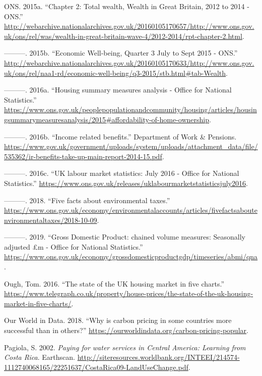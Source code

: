 \documentclass[]{tufte-handout}
\begin{document}
\leavevmode\hypertarget{ref-ONS2015}{}%
ONS. 2015a. ``Chapter 2: Total wealth, Wealth in Great Britain, 2012 to
2014 - ONS.''
\url{http://webarchive.nationalarchives.gov.uk/20160105170657/http://www.ons.gov.uk/ons/rel/was/wealth-in-great-britain-wave-4/2012-2014/rpt-chapter-2.html}.

\leavevmode\hypertarget{ref-ONSWELLBEING2015}{}%
---------. 2015b. ``Economic Well-being, Quarter 3 July to Sept 2015 -
ONS.''
\url{http://webarchive.nationalarchives.gov.uk/20160105170633/http://www.ons.gov.uk/ons/rel/naa1-rd/economic-well-being/q3-2015/stb.html\#tab-Wealth}.

\leavevmode\hypertarget{ref-ONS2016a}{}%
---------. 2016a. ``Housing summary measures analysis - Office for
National Statistics.''
\url{https://www.ons.gov.uk/peoplepopulationandcommunity/housing/articles/housingsummarymeasuresanalysis/2015\#affordability-of-home-ownership}.

\leavevmode\hypertarget{ref-ONS2016c}{}%
---------. 2016b. ``Income related benefits.'' Department of Work \&
Pensions.
\url{https://www.gov.uk/government/uploads/system/uploads/attachment_data/file/535362/ir-benefits-take-up-main-report-2014-15.pdf}.

\leavevmode\hypertarget{ref-ONS2016b}{}%
---------. 2016c. ``UK labour market statistics: July 2016 - Office for
National Statistics.''
\url{https://www.ons.gov.uk/releases/uklabourmarketstatisticsjuly2016}.

\leavevmode\hypertarget{ref-ONS2018}{}%
---------. 2018. ``Five facts about environmental taxes.''
\url{https://www.ons.gov.uk/economy/environmentalaccounts/articles/fivefactsaboutenvironmentaltaxes/2018-10-09}.

\leavevmode\hypertarget{ref-ONS2019}{}%
---------. 2019. ``Gross Domestic Product: chained volume measures:
Seasonally adjusted £m - Office for National Statistics.''
\url{https://www.ons.gov.uk/economy/grossdomesticproductgdp/timeseries/abmi/qna}.

\leavevmode\hypertarget{ref-Ough2016}{}%
Ough, Tom. 2016. ``The state of the UK housing market in five charts.''
\url{https://www.telegraph.co.uk/property/house-prices/the-state-of-the-uk-housing-market-in-five-charts/}.

\leavevmode\hypertarget{ref-OurWorldinData2018}{}%
Our World in Data. 2018. ``Why is carbon pricing in some countries more
successful than in others?''
\url{https://ourworldindata.org/carbon-pricing-popular}.

\leavevmode\hypertarget{ref-Pagiola2002}{}%
Pagiola, S. 2002. \emph{Paying for water services in Central America:
Learning from Costa Rica}. Earthscan.
\url{http://siteresources.worldbank.org/INTEEI/214574-1112740068165/22251637/CostaRica09-LandUseChange.pdf}.
\end{document}

